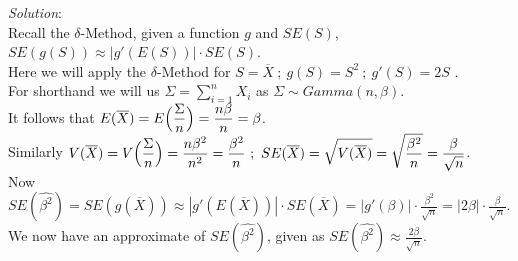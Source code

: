 \documentclass[12pt]{article}
\begin{document}
\textit{Solution}:
\vspace{2.5mm} \\

\noindent
Recall the $ \delta $-Method, given a function $ g $ and $ SE(S) $, $ SE(g(S)) \approx |g'(E(S))| \cdot SE(S) $. \\

\noindent
Here we will apply the $ \delta $-Method for $ S = \overline{X} \ ; \ g(S) = S^{2} \ ; \ g'(S) = 2S $ . \\

\noindent
For shorthand we will us $ \displaystyle \Sigma = \sum_{i=1}^{n} X_{i} $ as $ \Sigma \sim Gamma(n, \beta) $. \\

\noindent
It follows that $ \displaystyle E(\overline{X}) = E\Bigl( \frac{\Sigma}{n} \Bigr) = \frac{n\beta}{n} = \beta $. \\

\noindent
Similarly $ \displaystyle V(\overline{X}) = V\Bigl( \frac{\Sigma}{n} \Bigr) = \frac{n\beta^{2}}{n^{2}} = \frac{\beta^{2}}{n} \ ; \ SE(\overline{X}) = \sqrt{V(\overline{X})} = \sqrt{\frac{\beta^{2}}{n}} = \frac{\beta}{\sqrt{n}} $. \\

\noindent
Now $ \displaystyle SE(\hat{\beta^{2}}) = SE(g(\overline{X})) \approx |g'(E(\overline{X}))| \cdot SE(\overline{X}) = |g'(\beta)| \cdot \frac{\beta^{2}}{\sqrt{n}} = |2\beta| \cdot \frac{\beta}{\sqrt{n}}  $. \\

\noindent
We now have an approximate of $ SE(\hat{\beta^{2}}) $, given as $ \displaystyle SE(\hat{\beta^{2}}) \approx \frac{2\beta}{\sqrt{n}} $. \\
\end{document}
